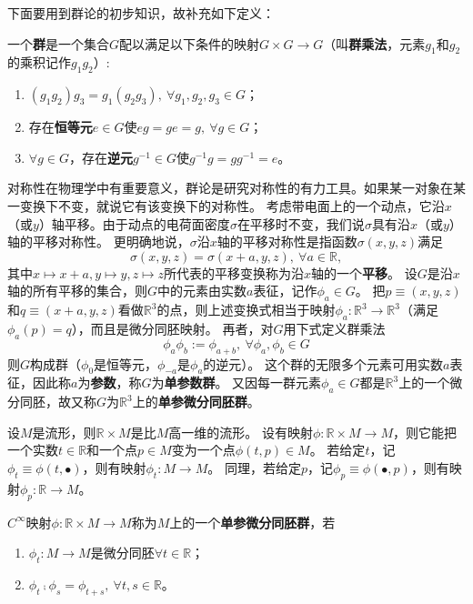 下面要用到群论的初步知识，故补充如下定义：

\begin{definition}
一个\textbf{群}是一个集合$G$配以满足以下条件的映射$G \times G \to G$（叫\textbf{群乘法}，元素$g_1$和$g_2$的乘积记作$g_1g_2$）:
\begin{enumerate}[（a）]
\item $(g_1g_2)g_3 = g_1(g_2g_3), ~ \forall g_1, g_2, g_3 \in G$；
\item 存在\textbf{恒等元}$e \in G$使$eg = ge = g, ~ \forall g \in G$；
\item $\forall g \in G$，存在\textbf{逆元}$g^{-1} \in G$使$g^{-1}g = gg^{-1} = e$。
\end{enumerate}
\end{definition}

对称性在物理学中有重要意义，群论是研究对称性的有力工具。如果某一对象在某一变换下不变，就说它有该变换下的对称性。
考虑带电面上的一个动点，它沿$x$（或$y$）轴平移。由于动点的电荷面密度$\sigma$在平移时不变，我们说$\sigma$具有沿$x$（或$y$）轴的平移对称性。
更明确地说，$\sigma$沿$x$轴的平移对称性是指函数$\sigma(x, y, z)$满足
$$\sigma(x, y, z) = \sigma(x + a, y, z), ~ \forall a \in \mathbb{R},$$
其中$x \mapsto x + a, y \mapsto y, z \mapsto z$所代表的平移变换称为沿$x$轴的一个\textbf{平移}。
设$G$是沿$x$轴的所有平移的集合，则$G$中的元素由实数$a$表征，记作$\phi_a \in G$。
把$p \equiv (x, y, z)$和$q \equiv (x + a, y, z)$看做$\mathbb{R}^3$的点，则上述变换式相当于映射$\phi_a \colon \mathbb{R}^3 \to \mathbb{R}^3$（满足$\phi_a(p) = q$），而且是微分同胚映射。
再者，对$G$用下式定义群乘法
$$\phi_a\phi_b := \phi_{a + b}, ~ \forall \phi_a, \phi_b \in G$$
则$G$构成群（$\phi_0$是恒等元，$\phi_{-a}$是$\phi_a$的逆元）。
这个群的无限多个元素可用实数$a$表征，因此称$a$为\textbf{参数}，称$G$为\textbf{单参数群}。
又因每一群元素$\phi_a \in G$都是$\mathbb{R}^3$上的一个微分同胚，故又称$G$为$\mathbb{R}^3$上的\textbf{单参微分同胚群}。

设$M$是流形，则$\mathbb{R} \times M$是比$M$高一维的流形。
设有映射$\phi \colon \mathbb{R} \times M \to M$，则它能把一个实数$t \in \mathbb{R}$和一个点$p \in M$变为一个点$\phi(t, p) \in M$。
若给定$t$，记$\phi_t \equiv \phi(t, \bullet)$，则有映射$\phi_t \colon M \to M$。
同理，若给定$p$，记$\phi_p \equiv \phi(\bullet, p)$，则有映射$\phi_p \colon \mathbb{R} \to M$。

\begin{definition}
$C^\infty$映射$\phi \colon \mathbb{R} \times M \to M$称为$M$上的一个\textbf{单参微分同胚群}，若
\begin{enumerate}[（a）]
\item $\phi_t \colon M \to M$是微分同胚$\forall t \in \mathbb{R}$；
\item $\phi_t \comp \phi_s = \phi_{t + s}, ~ \forall t, s \in \mathbb{R}$。
\end{enumerate}
\end{definition}

